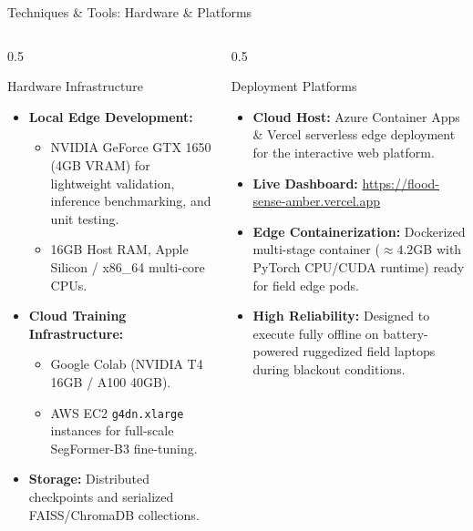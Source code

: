 \documentclass[aspectratio=169, 10pt, professionalfonts]{beamer}
\begin{document}
\begin{frame}{Techniques \& Tools: Hardware \& Platforms}
  \begin{columns}[T]
    \begin{column}{0.5\textwidth}
      \begin{block}{Hardware Infrastructure}
        \begin{itemize}\setlength{\itemsep}{0.5em}\footnotesize
          \item \textbf{Local Edge Development:}
            \begin{itemize}\footnotesize
              \item NVIDIA GeForce GTX 1650 (4GB VRAM) for lightweight validation, inference benchmarking, and unit testing.
              \item 16GB Host RAM, Apple Silicon / x86\_64 multi-core CPUs.
            \end{itemize}
          \item \textbf{Cloud Training Infrastructure:}
            \begin{itemize}\footnotesize
              \item Google Colab (NVIDIA T4 16GB / A100 40GB).
              \item AWS EC2 \texttt{g4dn.xlarge} instances for full-scale SegFormer-B3 fine-tuning.
            \end{itemize}
          \item \textbf{Storage:} Distributed checkpoints and serialized FAISS/ChromaDB collections.
        \end{itemize}
      \end{block}
    \end{column}
    
    \begin{column}{0.5\textwidth}
      \begin{block}{Deployment Platforms}
        \begin{itemize}\setlength{\itemsep}{0.5em}\footnotesize
          \item \textbf{Cloud Host:} Azure Container Apps \& Vercel serverless edge deployment for the interactive web platform.
          \item \textbf{Live Dashboard:} \url{https://flood-sense-amber.vercel.app}
          \item \textbf{Edge Containerization:} Dockerized multi-stage container ($\approx 4.2$GB with PyTorch CPU/CUDA runtime) ready for field edge pods.
          \item \textbf{High Reliability:} Designed to execute fully offline on battery-powered ruggedized field laptops during blackout conditions.
        \end{itemize}
      \end{block}
    \end{column}
  \end{columns}
\end{frame}
\end{document}
